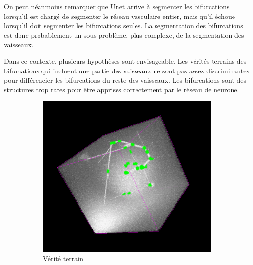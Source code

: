 On peut néanmoins remarquer que Unet arrive à segmenter les bifurcations lorsqu'il est chargé de segmenter le réseau vasculaire entier, mais qu'il échoue lorsqu'il doit segmenter les bifurcations seules. La segmentation des bifurcations est donc probablement un sous-problème, plus complexe, de la segmentation des vaisseaux. 

Dans ce contexte, plusieurs hypothèses sont envisageable. Les vérités terrains des bifurcations qui incluent une partie des vaisseaux ne sont pas assez discriminantes pour différencier les bifurcations du reste des vaisseaux. Les bifurcations sont des structures trop rares pour être apprises correctement par le réseau de neurone.

\begin{figure}[!ht]
    \centering
    \begin{subfigure}{0.45\textwidth}
        \includegraphics[width=\textwidth]{Images/exp_seg_gt.png}
        \caption{Vérité terrain}
    \end{subfigure}
    \begin{subfigure}{0.45\textwidth}

\end{subfigure}
\end{figure}
